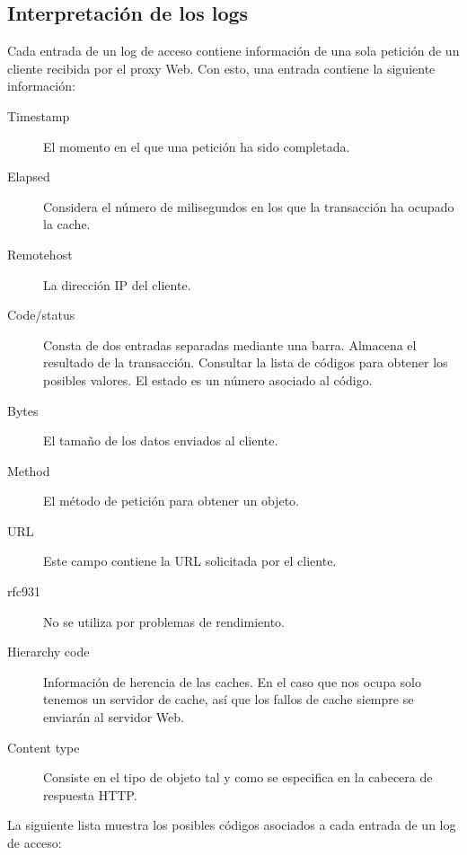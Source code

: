 \documentclass[twocolumn]{Jornadas}
\begin{document}
\subsection{Interpretación de los logs}

Cada entrada de un log de acceso contiene información de una sola petición de un cliente recibida por el proxy Web. Con esto, una entrada contiene la siguiente información:

\begin{description}
\item[Timestamp] El momento en el que una petición ha sido completada.
\item[Elapsed] Considera el número de milisegundos en los que la transacción ha ocupado la cache.
\item[Remotehost] La dirección IP del cliente.
\item[Code/status] Consta de dos entradas separadas mediante una barra. Almacena el resultado de la transacción. Consultar la lista de códigos para obtener los posibles valores.
El estado es un número asociado al código.
\item[Bytes] El tamaño de los datos enviados al cliente.
\item[Method] El método de petición para obtener un objeto.
\item[URL] Este campo contiene la URL solicitada por el cliente.
\item[rfc931] No se utiliza por problemas de rendimiento.
\item[Hierarchy code] Información de herencia de las caches. En el caso que nos ocupa solo tenemos un servidor de cache, así que los fallos de cache siempre se enviarán al servidor Web. 
\item[Content type] Consiste en el tipo de objeto tal y como se especifica en la cabecera de respuesta HTTP.
\end{description}

La siguiente lista muestra los posibles códigos asociados a cada entrada de un log de acceso:
\end{document}
